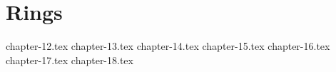 \part{Rings}
{chapter-12.tex}
{chapter-13.tex}
{chapter-14.tex}
{chapter-15.tex}
{chapter-16.tex}
{chapter-17.tex}
{chapter-18.tex}
